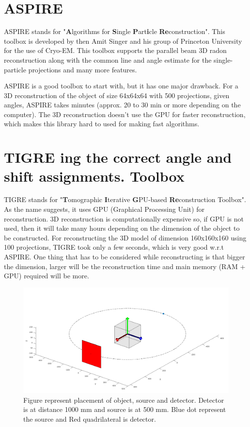 \documentclass[twoside]{iitbreport}
\begin{document}
\section{ASPIRE}

ASPIRE\protect\footnotemark{} stands for "\textbf{A}lgorithms for \textbf{S}ingle \textbf{P}art\textbf{i}cle \textbf{Re}construction". This toolbox is developed by then Amit Singer and his group of Princeton University for the use of Cryo-EM. This toolbox supports the parallel beam 3D radon reconstruction along with the common line and angle estimate for the single-particle projections and many more features. 

ASPIRE is a good toolbox to start with, but it has one major drawback. For a 3D reconstruction of the object of size 64x64x64 with 500 projections, given angles, ASPIRE takes minutes (approx. 20 to 30 min or more depending on the computer). The 3D reconstruction doesn't use the GPU for faster reconstruction, which makes this library hard to used for making fast algorithms. 

\section{TIGRE ing the correct angle and shift assignments.
Toolbox}\label{subsec:TIGRE}
TIGRE\protect\footnotemark{} stands for "\textbf{T}omographic \textbf{I}terative \textbf{G}PU-based \textbf{Re}construction Toolbox". As the name suggests, it uses GPU (Graphical Processing Unit) for reconstruction. 3D reconstruction is computationally expensive so, if GPU is not used, then it will take many hours depending on the dimension of the object to be constructed. For reconstructing the 3D model of dimension 160x160x160 using 100 projections, TIGRE took only a few seconds, which is very good w.r.t ASPIRE. One thing that has to be considered while reconstructing is that bigger the dimension, larger will be the reconstruction time and main memory (RAM + GPU) required will be more. \\

\begin{figure}[H]
\includegraphics[width=1\linewidth]{tigre_projection_geomtery.png}
\centering
\captionsetup{justification=centering}
\caption{Figure represent placement of object, source and detector. Detector is at distance 1000 mm and  source is at 500 mm. Blue dot represent the source and Red quadrilateral is detector.}
\label{fig: tigre_projection_geomtery}
\end{figure}
\end{document}
